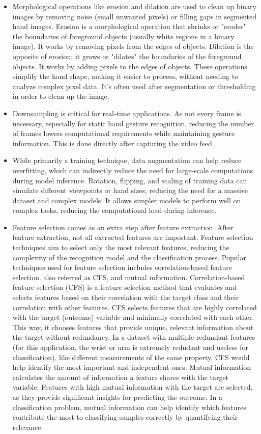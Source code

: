\documentclass[12pt]{article}
\begin{document}
\begin{itemize}
  \item Morphological operations like erosion and dilation are used to clean up binary images by removing noise (small unwanted pixels) or filling gaps in segmented hand images. Erosion is a morphological operation that shrinks or "erodes" the boundaries of foreground objects (usually white regions in a binary image). It works by removing pixels from the edges of objects. Dilation is the opposite of erosion; it grows or "dilates" the boundaries of the foreground objects. It works by adding pixels to the edges of objects. These operations simplify the hand shape, making it easier to process, without needing to analyze complex pixel data. It's often used after segmentation or thresholding in order to clean up the image.
  \item Downsampling is critical for real-time applications. As not every frame is necessary, especially for static hand gesture recognition, reducing the number of frames lowers computational requirements while maintaining gesture information. This is done directly after capturing the video feed.
  \item While primarily a training technique, data augmentation can help reduce overfitting, which can indirectly reduce the need for large-scale computations during model inference. Rotation, flipping, and scaling of training data can simulate different viewpoints or hand sizes, reducing the need for a massive dataset and complex models. It allows simpler models to perform well on complex tasks, reducing the computational load during inference.
  \item Feature selection comes as an extra step after feature extraction. After feature extraction, not all extracted features are important. Feature selection techniques aim to select only the most relevant features, reducing the complexity of the recognition model and the classification process. Popular techniques used for feature selection includes correlation-based feature selection. also referred as CFS, and mutual information. Correlation-based feature selection (CFS) is a feature selection method that evaluates and selects features based on their correlation with the target class and their correlation with other features. CFS selects features that are highly correlated with the target (outcome) variable and minimally correlated with each other. This way, it chooses features that provide unique, relevant information about the target without redundancy. In a dataset with multiple redundant features (for this application, the wrist or arm is extremely redudant and useless for classification), like different measurements of the same property, CFS would help identify the most important and independent ones. Mutual information calculates the amount of information a feature shares with the target variable. Features with high mutual information with the target are selected, as they provide significant insights for predicting the outcome. In a classification problem, mutual information can help identify which features contribute the most to classifying samples correctly by quantifying their relevance. 
\end{itemize}
\end{document}
